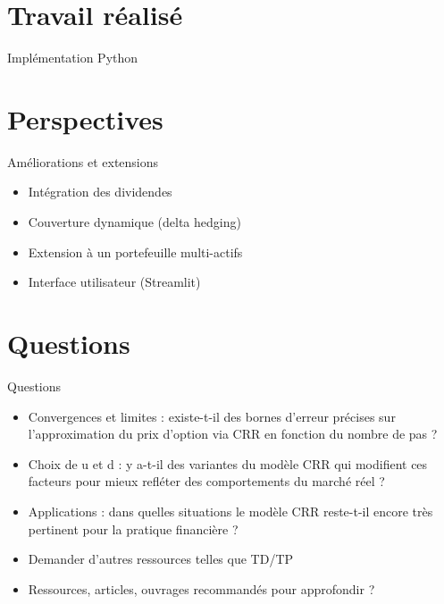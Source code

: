 \documentclass[11pt]{beamer}
\begin{document}
\section{Travail réalisé}

\begin{frame}{Implémentation Python}

\end{frame}

\section{Perspectives}

\begin{frame}{Améliorations et extensions}
\begin{itemize}
    \item Intégration des dividendes
    \item Couverture dynamique (delta hedging)
    \item Extension à un portefeuille multi-actifs
    \item Interface utilisateur (Streamlit)
\end{itemize}
\end{frame}

\section{Questions}

\begin{frame}{Questions}
\begin{center}
    \begin{itemize}
        \item Convergences et limites : existe-t-il des bornes d’erreur précises sur l’approximation du prix d’option via CRR en fonction du nombre de pas ?
        \item Choix de u et d : y a-t-il des variantes du modèle CRR qui modifient ces facteurs pour mieux refléter des comportements du marché réel ?
        \item Applications :  dans quelles situations le modèle CRR reste-t-il encore très pertinent pour la pratique financière ?
        \item Demander d'autres ressources telles que TD/TP
        \item Ressources, articles, ouvrages recommandés pour approfondir ?
    \end{itemize}
\end{center}

\vspace{0.5cm}

\end{frame}
\end{document}
